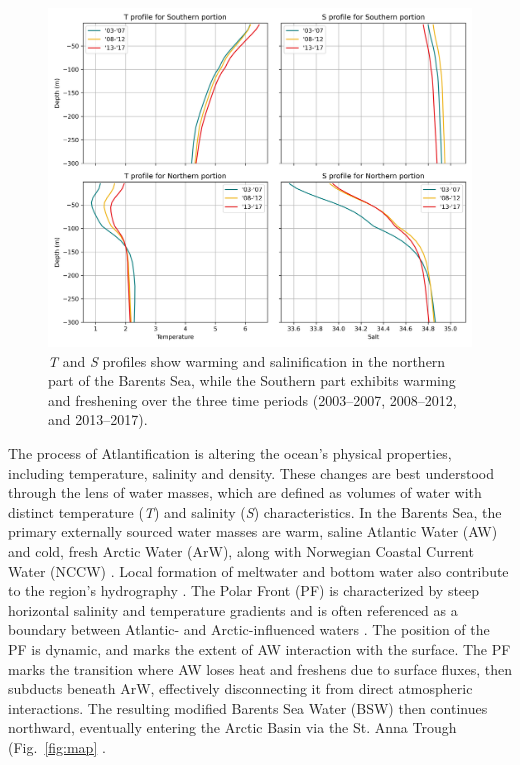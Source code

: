 \documentclass[draft]{agujournal2019}
\begin{document}

\begin{figure} %
    \centering
    \includegraphics[width=\linewidth]{figs/profiles.png}
    \caption{\emph{T} and \emph{S} profiles show warming and salinification in the northern part of the Barents Sea, while the Southern part exhibits warming and freshening over the three time periods (2003–2007, 2008–2012, and 2013–2017).}
    \label{fig:profiles}
    \vspace{-30pt}
\end{figure}

The process of Atlantification is altering the ocean's physical properties, including temperature, salinity and density. These changes are best understood through the lens of water masses, which are defined as volumes of water with distinct temperature (\emph{T}) and salinity (\emph{S}) characteristics. In the Barents Sea, the primary externally sourced water masses are warm, saline Atlantic Water (AW) and cold, fresh Arctic Water (ArW), along with Norwegian Coastal Current Water (NCCW) \cite{Loeng1991,Smedsrud2010}. Local formation of meltwater and bottom water also contribute to the region's hydrography \cite{Oziel2016}. The Polar Front (PF) is characterized by steep horizontal salinity and temperature gradients and is often referenced as a boundary between Atlantic- and Arctic-influenced waters \cite{Oziel2016,Barton18,kolas2024,Kalhagen2024}. The position of the PF is dynamic, and marks the extent of AW interaction with the surface. The PF marks the transition where AW loses heat and freshens due to surface fluxes, then subducts beneath ArW, effectively disconnecting it from direct atmospheric interactions. The resulting modified Barents Sea Water (BSW) then continues northward, eventually entering the Arctic Basin via the St. Anna Trough (Fig.~\ref{fig:map} \cite{schauer2002}.
\end{document}
